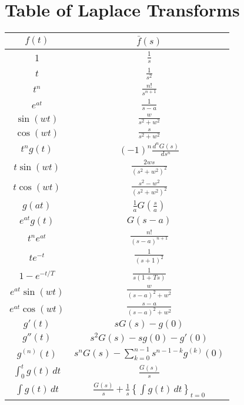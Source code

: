 \documentclass[cplx.tex]{subfiles}
\begin{document}
\chapter*{Table of Laplace Transforms}
\begin{center}
    \begin{tabular}{c|c}
        $f(t)$ & $\bar{f}(s)$ \\
        \hline
        1 & $\frac{1}{s}$  \\
        $t$ & $\frac{1}{s^2}$  \\
        $t^n$ & $\frac{n!}{s^{n+1}}$  \\
        $e^{at}$ & $\frac{1}{s-a}$  \\
        $\sin(wt)$ & $\frac{w}{s^2+w^2}$  \\
        $\cos(wt)$ & $\frac{s}{s^2+w^2}$  \\
        $t^ng(t)$ & $(-1)^n\frac{d^nG(s)}{ds^n}$  \\
        $t\sin(wt)$ & $\frac{2ws}{(s^2+w^2)^2}$  \\
        $t\cos(wt)$ & $\frac{s^2-w^2}{(s^2+w^2)^2}$  \\
        $g(at)$ & $\frac{1}{a}G\left(\frac{s}{a}\right)$  \\
        $e^{at}g(t)$ & $G(s-a)$  \\
        $t^ne^{at}$ & $\frac{n!}{(s-a)^{n+1}}$  \\
        $te^{-t}$ & $\frac{1}{(s+1)^2}$  \\
        $1-e^{-t/T}$ & $\frac{1}{s(1+Ts)}$ \\
        $e^{at}\sin(wt)$ & $\frac{w}{(s-a)^2+w^2}$  \\
        $e^{at}\cos(wt)$ & $\frac{s-a}{(s-a)^2+w^2}$  \\
        $g'(t)$ & $sG(s) - g(0)$  \\
        $g''(t)$ & $s^2G(s) - sg(0) - g'(0)$  \\
        $g^{(n)}(t)$ & $s^nG(s) - \sum_{k=0}^{n-1} s^{n-1-k}g^{(k)}(0)$ \\
        $\int_0^t g(t)\,dt$ & $\frac{G(s)}{s}$  \\
        $\int g(t)\,dt$ & $\frac{G(s)}{s} + \frac1s\left\{\int g(t)\,dt\right\}_{t=0}$  
    \end{tabular}
\end{center}
\end{document}

